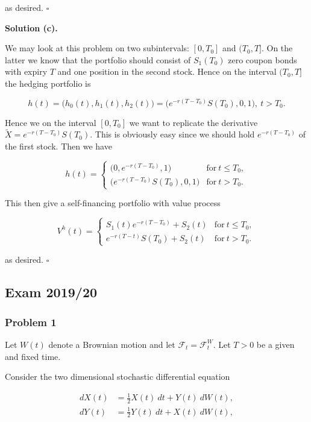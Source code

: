 \documentclass[
]{article}
\begin{document}
as desired. \(\square\)

\textbf{Solution (c).}

We may look at this problem on two subintervals: \([0,T_0]\) and
\((T_0,T]\). On the latter we know that the portfolio should consist of
\(S_1(T_0)\) zero coupon bonds with expiry \(T\) and one position in the
second stock. Hence on the interval \((T_0,T]\) the hedging portfolio is

\[
h(t)=\Big(h_0(t),h_1(t),h_2(t)\Big)=\Big(e^{-r(T-T_0)}S(T_0),0,1\Big),\ t> T_0.
\]

Hence we on the interval \([0,T_0]\) we want to replicate the derivative
\(\widetilde{X}=e^{-r(T-T_0)}S(T_0)\). This is obviously easy since we
should hold \(e^{-r(T-T_0)}\) of the first stock. Then we have

\[
h(t)=\begin{cases}
\Big(0,e^{-r(T-T_0)},1\Big) &\text{for}\ t\le T_0,\\
\Big(e^{-r(T-T_0)}S(T_0),0,1\Big) &\text{for}\ t>T_0.
\end{cases}
\]

This then give a self-financing portfolio with value process

\[
V^h(t)=\begin{cases}
S_1(t)e^{-r(T-T_0)}+S_2(t) &\text{for}\ t\le T_0,\\
e^{-r(T-t)}S(T_0)+S_2(t) &\text{for}\ t>T_0.
\end{cases}
\]

as desired. \(\square\)

\hypertarget{exam-201920}{%
\subsection{Exam 2019/20}\label{exam-201920}}

\hypertarget{problem-1-2}{%
\subsubsection{Problem 1}\label{problem-1-2}}

Let \(W(t)\) denote a Brownian motion and let
\(\mathcal{F}_t=\mathcal{F}_t^W\). Let \(T>0\) be a given and fixed
time.

Consider the two dimensional stochastic differential equation

\begin{align*}
dX(t)&=\frac{1}{2}X(t)\ dt+Y(t)\ dW(t),\\
dY(t)&=\frac{1}{2}Y(t)\ dt+X(t)\ dW(t),
\end{align*}
\end{document}
